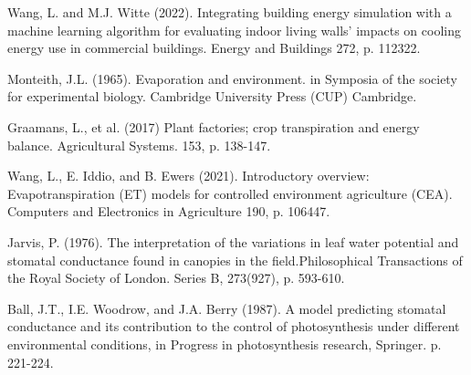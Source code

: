 Wang, L. and M.J. Witte (2022). Integrating building energy simulation with a machine learning algorithm for evaluating indoor living walls’ impacts on cooling energy use in commercial buildings. Energy and Buildings 272, p. 112322.

  Monteith, J.L. (1965). Evaporation and environment. in Symposia of the society for experimental biology. Cambridge University Press (CUP) Cambridge.

  Graamans, L., et al. (2017) Plant factories; crop transpiration and energy balance. Agricultural Systems. 153, p. 138-147.

  Wang, L., E. Iddio, and B. Ewers (2021). Introductory overview: Evapotranspiration (ET) models for controlled environment agriculture (CEA). Computers and Electronics in Agriculture 190, p. 106447.

  Jarvis, P. (1976). The interpretation of the variations in leaf water potential and stomatal conductance found in canopies in the field.Philosophical Transactions of the Royal Society of London. Series B, 273(927), p. 593-610.

  Ball, J.T., I.E. Woodrow, and J.A. Berry (1987). A model predicting stomatal conductance and its contribution to the control of photosynthesis under different environmental conditions, in Progress in photosynthesis research, Springer. p. 221-224.

